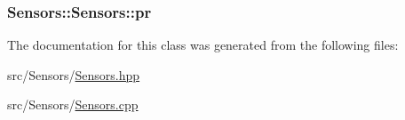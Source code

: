 \subsubsection[{\texorpdfstring{pr}{pr}}]{ Sensors\+::\+Sensors\+::pr\hspace{0.3cm}{\ttfamily [private]}}\hypertarget{classSensors_1_1Sensors_a6f8be7ead5ea5f1d116273510879c7cf}{}\label{classSensors_1_1Sensors_a6f8be7ead5ea5f1d116273510879c7cf}


The documentation for this class was generated from the following files\+:\begin{DoxyCompactItemize}
\item 
src/\+Sensors/\hyperlink{Sensors_8hpp}{Sensors.\+hpp}\item 
src/\+Sensors/\hyperlink{Sensors_8cpp}{Sensors.\+cpp}\end{DoxyCompactItemize}
